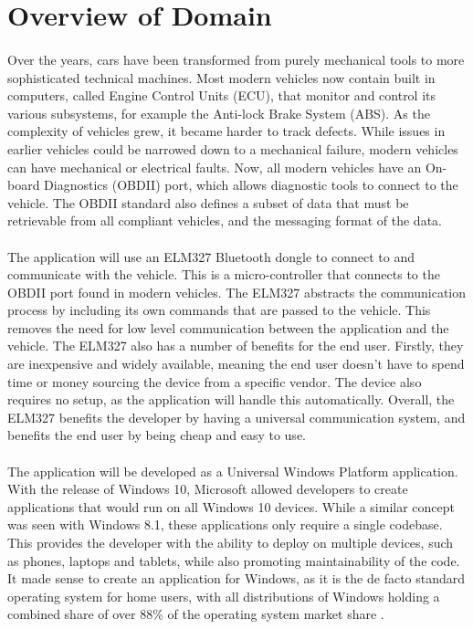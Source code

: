 \section{Overview of Domain}
	\paragraph{}{
	Over the years, cars have been transformed from purely mechanical tools to more sophisticated technical machines. Most modern vehicles now contain built in computers, called Engine Control Units (ECU), that monitor and control its various subsystems, for example the Anti-lock Brake System (ABS). As the complexity of vehicles grew, it became harder to track defects. While issues in earlier vehicles could be narrowed down to a mechanical failure, modern vehicles can have mechanical or electrical faults. Now, all modern vehicles have an On-board Diagnostics (OBDII) port, which allows diagnostic tools to connect to the vehicle. The OBDII standard also defines a subset of data that must be retrievable from all compliant vehicles, and the messaging format of the data.		 
	}
	\paragraph{}{
	The application will use an ELM327 Bluetooth dongle to connect to and communicate with the vehicle. This is a micro-controller that connects to the OBDII port found in modern vehicles. The ELM327 abstracts the communication process by including its own commands that are passed to the vehicle. This removes the need for low level communication between the application and the vehicle. The ELM327 also has a number of benefits for the end user. Firstly, they are inexpensive and widely available, meaning the end user doesn't have to spend time or money sourcing the device from a specific vendor. The device also requires no setup, as the application will handle this automatically. Overall, the ELM327 benefits the developer by having a universal communication system, and benefits the end user by being cheap and easy to use.
	}
	\paragraph{}{
	The application will be developed as a Universal Windows Platform application. With the release of Windows 10, Microsoft allowed developers to create applications that would run on all Windows 10 devices. While a similar concept was seen with Windows 8.1, these applications only require a single codebase. This provides the developer with the ability to deploy on multiple devices, such as phones, laptops and tablets, while also promoting maintainability of the code. It made sense to create an application for Windows, as it is the de facto standard operating system for home users, with all distributions of Windows holding a combined share of over 88{\%} of the operating system market share \citep{OSMarketShare}.
	}
